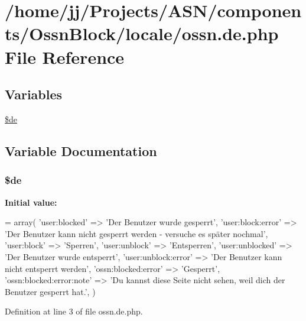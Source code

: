 \hypertarget{components_2_ossn_block_2locale_2ossn_8de_8php}{}\section{/home/jj/\+Projects/\+A\+S\+N/components/\+Ossn\+Block/locale/ossn.de.\+php File Reference}
\label{components_2_ossn_block_2locale_2ossn_8de_8php}
\subsection*{Variables}
\begin{DoxyCompactItemize}
\item 
\hyperlink{components_2_ossn_block_2locale_2ossn_8de_8php_aab7de7e51b4580005f63dd4cf5e17311}{\$de}
\end{DoxyCompactItemize}


\subsection{Variable Documentation}
\subsubsection[{\texorpdfstring{\$de}{$de}}]{\setlength{\rightskip}{0pt plus 5cm}\$de}\hypertarget{components_2_ossn_block_2locale_2ossn_8de_8php_aab7de7e51b4580005f63dd4cf5e17311}{}\label{components_2_ossn_block_2locale_2ossn_8de_8php_aab7de7e51b4580005f63dd4cf5e17311}
{\bfseries Initial value\+:}
\begin{DoxyCode}
= array(
    \textcolor{stringliteral}{'user:blocked'} => \textcolor{stringliteral}{'Der Benutzer wurde gesperrt'},
    \textcolor{stringliteral}{'user:block:error'} => \textcolor{stringliteral}{'Der Benutzer kann nicht gesperrt werden - versuche es später nochmal'},
    \textcolor{stringliteral}{'user:block'} => \textcolor{stringliteral}{'Sperren'},
    \textcolor{stringliteral}{'user:unblock'} => \textcolor{stringliteral}{'Entsperren'},
    \textcolor{stringliteral}{'user:unblocked'} => \textcolor{stringliteral}{'Der Benutzer wurde entsperrt'},
    \textcolor{stringliteral}{'user:unblock:error'} => \textcolor{stringliteral}{'Der Benutzer kann nicht entsperrt werden'}, 
    \textcolor{stringliteral}{'ossn:blocked:error'} => \textcolor{stringliteral}{'Gesperrt'},
    \textcolor{stringliteral}{'ossn:blocked:error:note'} => \textcolor{stringliteral}{'Du kannst diese Seite nicht sehen, weil dich der Benutzer gesperrt hat.'}, 
)
\end{DoxyCode}


Definition at line 3 of file ossn.\+de.\+php.

